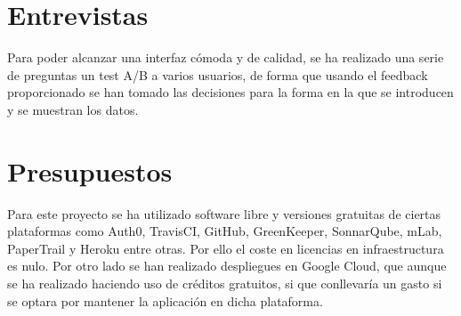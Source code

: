 \section {Entrevistas}
Para poder alcanzar una interfaz cómoda y de calidad, se ha realizado una serie de preguntas un \gls{test A/B} a varios usuarios, de forma que usando el feedback proporcionado se han tomado las decisiones para la forma en la que se introducen y se muestran los datos.

\section {Presupuestos}

Para este proyecto se ha utilizado software libre y versiones gratuitas de ciertas plataformas como Auth0, TravisCI, GitHub, GreenKeeper, SonnarQube, mLab, PaperTrail y Heroku entre otras. Por ello el coste en licencias en infraestructura es nulo. Por otro lado se han realizado despliegues en Google Cloud, que aunque se ha realizado haciendo uso de créditos gratuitos, si que conllevaría un gasto si se optara por mantener la aplicación en dicha plataforma.

